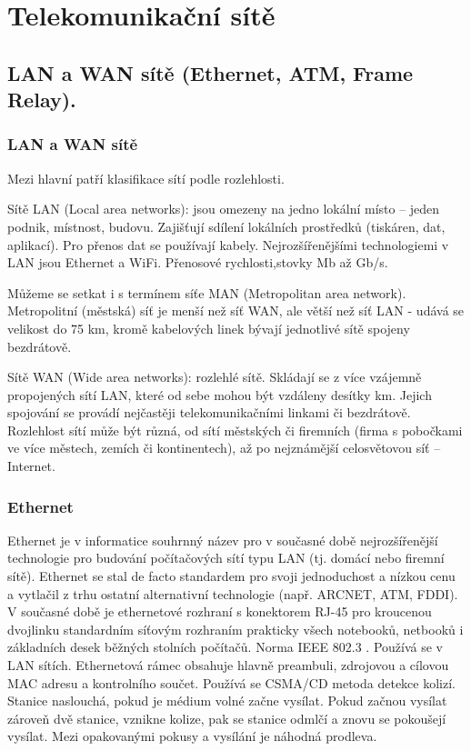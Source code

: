 \section{Telekomunikační sítě}
\subsection{LAN a WAN sítě (Ethernet, ATM, Frame Relay).}
\subsubsection{LAN a WAN sítě}
Mezi hlavní patří klasifikace sítí podle rozlehlosti.


Sítě LAN (Local area networks): jsou omezeny na jedno lokální místo – jeden podnik, místnost, budovu. Zajišťují sdílení lokálních prostředků (tiskáren, dat, aplikací). 
Pro přenos dat se používají kabely. Nejrozšířenějšími technologiemi v LAN jsou Ethernet a WiFi. Přenosové rychlosti,stovky Mb až Gb/s.


Můžeme se setkat i s termínem síťe MAN (Metropolitan area network). Metropolitní (městská) síť je menší než síť WAN, ale větší než síť LAN - udává se velikost do 75 km, kromě kabelových linek bývají jednotlivé sítě spojeny bezdrátově.


Sítě WAN (Wide area networks): rozlehlé sítě. Skládají se z více vzájemně propojených sítí LAN, které od sebe mohou být vzdáleny desítky km. Jejich spojování se provádí nejčastěji telekomunikačními linkami či bezdrátově. Rozlehlost sítí může být různá, od sítí městských či firemních (firma s pobočkami ve více městech, zemích či kontinentech), až po nejznámější celosvětovou síť – Internet.

\subsubsection{Ethernet}
Ethernet je v informatice souhrnný název pro v současné době nejrozšířenější technologie pro budování počítačových sítí typu LAN (tj. domácí nebo firemní sítě). Ethernet se stal de facto standardem pro svoji jednoduchost a nízkou cenu a vytlačil z trhu ostatní alternativní technologie (např. ARCNET, ATM, FDDI). V současné době je ethernetové rozhraní s konektorem RJ-45 pro kroucenou dvojlinku standardním síťovým rozhraním prakticky všech notebooků, netbooků i základních desek běžných stolních počítačů. Norma IEEE 802.3 . Používá se v LAN sítích. Ethernetová rámec obsahuje hlavně preambuli, zdrojovou a cílovou MAC adresu a kontrolního součet. Používá se CSMA/CD metoda detekce kolizí. Stanice naslouchá, pokud je médium volné začne vysílat. Pokud začnou vysílat zároveň dvě stanice, vznikne kolize, pak se stanice odmlčí a znovu se pokoušejí vysílat. Mezi opakovanými pokusy a vysílání je náhodná prodleva.

